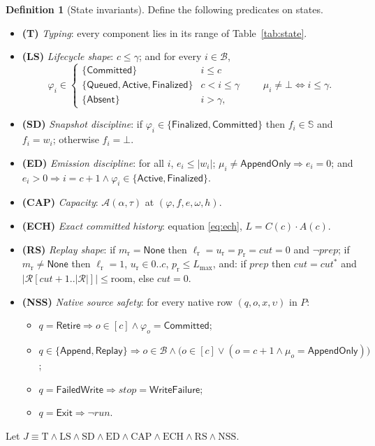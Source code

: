 \documentclass[11pt]{article}
\newcommand{\len}[1]{\lvert #1\rvert}
\newcommand{\cat}{\mathbin{\cdot}}             %
\newcommand{\Blocks}{\mathcal{B}}
\newcommand{\Snap}{\mathbb{S}}
\newcommand{\NoFinal}{\bot}
\newcommand{\Undecl}{\bot}
\newcommand{\AppendOnly}{\mathsf{AppendOnly}}
\newcommand{\Absent}{\mathsf{Absent}}
\newcommand{\Queued}{\mathsf{Queued}}
\newcommand{\Active}{\mathsf{Active}}
\newcommand{\Finalized}{\mathsf{Finalized}}
\newcommand{\Committed}{\mathsf{Committed}}
\newcommand{\None}{\mathsf{None}}
\newcommand{\srcApp}{\mathsf{Append}}
\newcommand{\srcRet}{\mathsf{Retire}}
\newcommand{\srcRep}{\mathsf{Replay}}
\newcommand{\srcFail}{\mathsf{FailedWrite}}
\newcommand{\srcExit}{\mathsf{Exit}}
\newcommand{\stWF}{\mathsf{WriteFailure}}
\newcommand{\AOK}{\mathcal{A}}
\newcommand{\RRows}{\mathcal{R}}
\newcommand{\Room}{\mathrm{room}}
\newcommand{\Ledger}{L}
\newcommand{\Native}{P}
\newcommand{\rmode}{m_{\mathrm{r}}}
\newcommand{\rcur}{\ell_{\mathrm{r}}}
\newcommand{\rend}{u_{\mathrm{r}}}
\newcommand{\rpart}{p_{\mathrm{r}}}
\newcommand{\rprep}{\mathit{prep}}
\newcommand{\rcut}{\mathit{cut}}
\newcommand{\run}{\mathit{run}}
\newcommand{\stopr}{\mathit{stop}}
\newcommand{\created}{\gamma}
\newcommand{\Lmax}{L_{\max}}
\theoremstyle{definition}
\newtheorem{definition}[theorem]{Definition}
\theoremstyle{remark}
\begin{document}
\begin{definition}[State invariants]\label{def:inv}
Define the following predicates on states.
\begin{itemize}
\item \textbf{(T)} \emph{Typing}: every component lies in its range of
  Table~\ref{tab:state}.
\item \textbf{(LS)} \emph{Lifecycle shape}: $c\le\created$;
  and for every $i\in\Blocks$,
  \[
    \varphi_i\in\begin{cases}
      \{\Committed\} & i\le c\\
      \{\Queued,\Active,\Finalized\} & c<i\le\created\\
      \{\Absent\} & i>\created,
    \end{cases}
    \qquad
    \mu_i\ne\Undecl \iff i\le\created .
  \]
\item \textbf{(SD)} \emph{Snapshot discipline}: if
  $\varphi_i\in\{\Finalized,\Committed\}$ then $f_i\in\Snap$ and $f_i=w_i$;
  otherwise $f_i=\NoFinal$.
\item \textbf{(ED)} \emph{Emission discipline}: for all $i$,
  $e_i\le\len{w_i}$; $\mu_i\ne\AppendOnly \Rightarrow e_i=0$; and
  $e_i>0 \Rightarrow i=c{+}1 \wedge \varphi_i\in\{\Active,\Finalized\}$.
\item \textbf{(CAP)} \emph{Capacity}: $\AOK(\alpha,\tau)$ at
  $(\varphi,f,e,\omega,h)$.
\item \textbf{(ECH)} \emph{Exact committed history}: equation \eqref{eq:ech},
  $\Ledger=C(c)\cat A(c)$.
\item \textbf{(RS)} \emph{Replay shape}: if $\rmode=\None$ then
  $\rcur=\rend=\rpart=\rcut=0$ and $\neg\rprep$; if $\rmode\ne\None$ then
  $\rcur=1$, $\rend\in 0..c$, $\rpart\le\Lmax$, and: if $\rprep$ then
  $\rcut=\rcut^{*}$ and
  $\len{\RRows[\rcut{+}1..\len{\RRows}]}\le\Room$, else $\rcut=0$.
\item \textbf{(NSS)} \emph{Native source safety}: for every native row
  $(q,o,x,\upsilon)$ in $\Native$:
  \begin{itemize}
  \item $q=\srcRet \Rightarrow o\in[c] \wedge \varphi_o=\Committed$;
  \item $q\in\{\srcApp,\srcRep\} \Rightarrow o\in\Blocks \wedge
    \bigl(o\in[c] \vee (o=c{+}1 \wedge \mu_o=\AppendOnly)\bigr)$;
  \item $q=\srcFail \Rightarrow \stopr=\stWF$;
  \item $q=\srcExit \Rightarrow \neg\run$.
  \end{itemize}
\end{itemize}
Let $J \equiv \mathrm{T}\wedge\mathrm{LS}\wedge\mathrm{SD}\wedge\mathrm{ED}
\wedge\mathrm{CAP}\wedge\mathrm{ECH}\wedge\mathrm{RS}\wedge\mathrm{NSS}$.
\end{definition}
\end{document}
